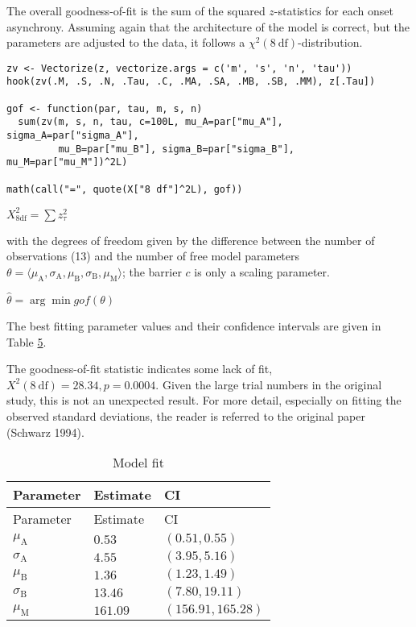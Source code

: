 The overall goodness-of-fit is the sum of the squared \(z\)-statistics for
each onset asynchrony. Assuming again that the architecture of the model
is correct, but the parameters are adjusted to the data, it follows a
\(\chi^2(8\ \mathrm{df})\)-distribution.

\begin{verbatim}
zv <- Vectorize(z, vectorize.args = c('m', 's', 'n', 'tau'))
hook(zv(.M, .S, .N, .Tau, .C, .MA, .SA, .MB, .SB, .MM), z[.Tau])

gof <- function(par, tau, m, s, n)
  sum(zv(m, s, n, tau, c=100L, mu_A=par["mu_A"], sigma_A=par["sigma_A"], 
         mu_B=par["mu_B"], sigma_B=par["sigma_B"], mu_M=par["mu_M"])^2L)

math(call("=", quote(X["8 df"]^2L), gof))
\end{verbatim}

\({{X}_{\mathrm{8 df}}^{2}}{=}{\sum{{z}_{\tau}^{2}}}\)

with the degrees of freedom given by the difference between the number
of observations (13) and the number of free model parameters
\(\theta = \langle\mu_{\mathrm A}, \sigma_{\mathrm A}, \mu_{\mathrm B}, \sigma_{\mathrm B}, \mu_{\mathrm M}\rangle\);
the barrier \(c\) is only a scaling parameter.

\({\hat{\theta}}{=}{\arg\min{gof{\left(\theta\right)}}}\)

The best fitting parameter values and their confidence intervals are
given in Table \protect\hyperlink{tab:params}{5}.

The goodness-of-fit statistic indicates some lack of fit,
\(X^2(8\ \mathrm{df}) = 28.34, p = 0.0004\). Given the large trial
numbers in the original study, this is not an unexpected result. For
more detail, especially on fitting the observed standard deviations, the
reader is referred to the original paper (Schwarz 1994).

\hypertarget{tab:params}{}
\begin{longtable}[]{@{}lll@{}}
\caption{Model fit}\tabularnewline
\toprule\noalign{}
Parameter & Estimate & CI \\
\midrule\noalign{}
\endfirsthead
\toprule\noalign{}
Parameter & Estimate & CI \\
\midrule\noalign{}
\endhead
\bottomrule\noalign{}
\endlastfoot
\({\mu}_{\mathrm{A}}\) & \(0.53\) & \(\left({0.51}{{,}{0.55}}\right)\) \\
\({\sigma}_{\mathrm{A}}\) & \(4.55\) & \(\left({3.95}{{,}{5.16}}\right)\) \\
\({\mu}_{\mathrm{B}}\) & \(1.36\) & \(\left({1.23}{{,}{1.49}}\right)\) \\
\({\sigma}_{\mathrm{B}}\) & \(13.46\) & \(\left({7.80}{{,}{19.11}}\right)\) \\
\({\mu}_{\mathrm{M}}\) & \(161.09\) & \(\left({156.91}{{,}{165.28}}\right)\) \\
\end{longtable}

